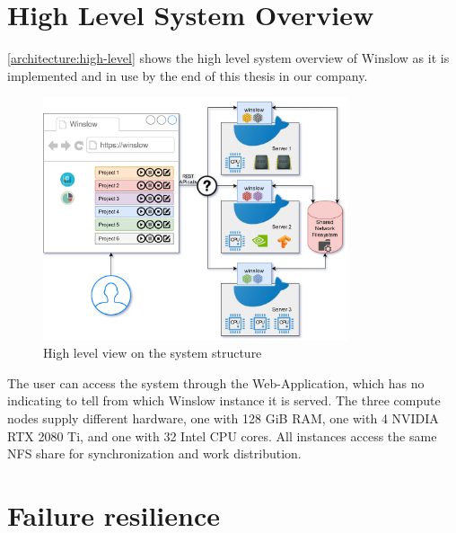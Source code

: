 
\section{High Level System Overview}

\autoref{architecture:high-level} shows the high level system overview of Winslow as it is implemented and in use by the end of this thesis in our company.

\begin{figure}[H]
	\centering
	\includegraphics[width=0.8\textwidth]{architecture.png}
	\caption{High level view on the system structure}
	\label{architecture:high-level}
\end{figure}

The user can access the system through the Web-Application, which has no indicating to tell from which Winslow instance it is served.
The three compute nodes supply different hardware, one with 128 GiB RAM, one with 4 NVIDIA RTX 2080 Ti, and one with 32 Intel CPU cores.
All instances access the same NFS share for synchronization and work distribution.



\section{Failure resilience}

